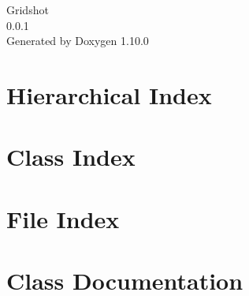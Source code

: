 \documentclass[twoside]{book}
\newcommand{\+}{\discretionary{\mbox{\scriptsize$\hookleftarrow$}}{}{}}
\newcommand{\clearemptydoublepage}{%
    \newpage{\pagestyle{empty}\cleardoublepage}%
  }
\begin{document}
  \raggedbottom
    \hypersetup{pageanchor=false,
                bookmarksnumbered=true,
                pdfencoding=unicode
               }
  \begin{titlepage}
  \vspace*{7cm}
  \begin{center}%
  {\Large Gridshot}\\
  [1ex]\large 0.\+0.\+1 \\
  \vspace*{1cm}
  {\large Generated by Doxygen 1.10.0}\\
  \end{center}
  \end{titlepage}
  \clearemptydoublepage
  \tableofcontents
  \clearemptydoublepage
  \hypersetup{pageanchor=true}
\chapter{Hierarchical Index}

\chapter{Class Index}

\chapter{File Index}

\chapter{Class Documentation}


















\end{document}
